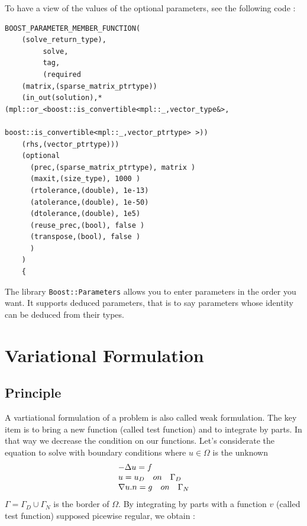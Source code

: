 To have a view of the values of the optional parameters, see the following code :

\begin{lstlisting}
BOOST_PARAMETER_MEMBER_FUNCTION(
	(solve_return_type),
         solve,
         tag,
         (required
	(matrix,(sparse_matrix_ptrtype))
	(in_out(solution),*(mpl::or_<boost::is_convertible<mpl::_,vector_type&>,
                                         boost::is_convertible<mpl::_,vector_ptrtype> >))
	(rhs,(vector_ptrtype)))
	(optional
	  (prec,(sparse_matrix_ptrtype), matrix )
	  (maxit,(size_type), 1000 )
	  (rtolerance,(double), 1e-13)
	  (atolerance,(double), 1e-50)
	  (dtolerance,(double), 1e5)
	  (reuse_prec,(bool), false )
	  (transpose,(bool), false )
	  )
	)
    {
\end{lstlisting}

\noindent The library \lstinline!Boost::Parameters! allows you to enter parameters in the order you want. It supports deduced parameters,  that is to say parameters whose identity can be deduced from their types.

\section{Variational Formulation}
\label{sec:vari-form}

\subsection{Principle}
\label{sec:vari-form-princip}
A vartiational formulation of a problem is also called weak formulation. The key item is to bring a new function (called test function) and to integrate by parts. In that way we decrease the condition on our functions.
\newline
\newline
Let's considerate the equation to solve with boundary conditions where $u  \in \varOmega$ is the unknown
\begin{equation}
\begin{array}{l l l}
	-\Delta u = f  \\
	u = u_D \quad on \quad \Gamma_D \\
	\nabla u.n = g \quad on \quad \Gamma_N
\end{array}
\end{equation}
$\Gamma = \Gamma_D \cup \Gamma_N$ is the border of $\varOmega$. By integrating by parts with a function $v$ (called test function) supposed picewise regular, we obtain :

